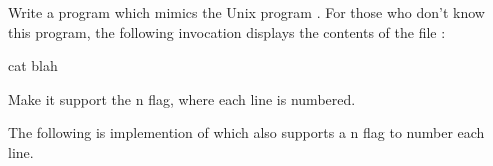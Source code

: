 \begin{Exercise}[title={Cat},difficulty=6]
\label{ex:cat}
\Question \label{ex:cat q1} Write a program which mimics the Unix program
. For those who don't know this program, the following 
invocation displays the contents of the file :
\begin{display}
\pr cat blah
\end{display}

\Question Make it support the \-n flag, where each line is
numbered.

\end{Exercise}

\begin{Answer}
\Question The following is implemention of  which also 
supports a \-n flag to number each line.

\showremarks
\end{Answer}
